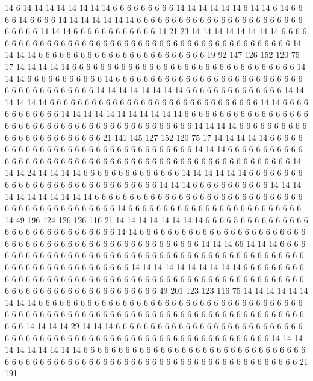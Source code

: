14 6 14 14 14 14 14 14 14 14 6 6 6 6 6 6 6 6 6 14
14 14 14 14 14 6 14 14 6 14 6 6 6 6 14 6 6 6 6 14
14 14 14 14 14 14 6 6 6 6 6 6 6 6 6 6 6 6 6 6
6 6 6 6 6 6 6 6 6 6 6 6 6 6 6 14 14 14 6 6
6 6 6 6 6 6 6 6 6 6 14 21 23 14 14 14 14 14 14 14
14 6 6 6 6 6 6 6 6 6 6 6 6 6 6 6 6 6 6 6
6 6 6 6 6 6 6 6 6 6 6 6 6 6 6 6 6 6 6 6
6 6 6 6 6 6 14 14 14 14 6 6 6 6 6 6 6 6 6 6
6 6 6 6 6 6 6 6 6 6 6 6 6 6 19 92 147 126 152 120
75 17 14 14 14 14 14 6 6 6 6 6 6 6 6 6 6 6 6 6
6 6 6 6 6 6 6 6 6 6 6 6 6 6 6 6 6 6 6 14
14 14 6 6 6 6 6 6 6 6 6 6 6 14 6 6 6 6 6 6
6 6 6 6 6 6 6 6 6 6 6 6 6 6 6 6 6 6 6 6
6 6 6 6 6 6 6 6 6 6 6 6 6 6 14 14 14 14 14 14
14 14 6 6 6 6 6 6 6 6 6 6 6 6 6 6 14 14 14 14
14 14 6 6 6 6 6 6 6 6 6 6 6 6 6 6 6 6 6 6
6 6 6 6 6 6 6 6 6 6 6 6 14 14 6 6 6 6 6 6
6 6 6 6 6 6 14 14 14 14 14 14 14 14 14 14 14 6 6 6
6 6 6 6 6 6 6 6 6 6 6 6 6 6 6 6 6 6 6 6
6 6 6 6 6 6 6 6 6 6 6 6 6 6 6 6 6 6 6 6
6 6 14 14 14 14 6 6 6 6 6 6 6 6 6 6 6 6 6 6
6 6 6 6 6 6 6 6 6 6 21 141 145 127 152 120 75 17 14 14
14 14 14 6 6 6 6 6 6 6 6 6 6 6 6 6 6 6 6 6
6 6 6 6 6 6 6 6 6 6 6 6 6 6 6 14 14 14 6 6
6 6 6 6 6 6 6 6 6 6 6 6 6 6 6 6 6 6 6 6
6 6 6 6 6 6 6 6 6 6 6 6 6 6 6 6 6 6 6 6
6 6 6 6 6 6 6 6 6 6 14 14 14 24 14 14 14 14 6 6
6 6 6 6 6 6 6 6 6 6 6 6 14 14 14 14 14 14 6 6
6 6 6 6 6 6 6 6 6 6 6 6 6 6 6 6 6 6 6 6
6 6 6 6 6 6 6 6 14 14 14 6 6 6 6 6 6 6 6 6
6 6 14 14 14 14 14 14 14 14 14 14 14 6 6 6 6 6 6 6
6 6 6 6 6 6 6 6 6 6 6 6 6 6 6 6 6 6 6 6
6 6 6 6 6 6 6 6 6 6 6 6 6 6 6 6 6 6 6 14
6 6 6 6 6 6 6 6 6 6 6 6 6 6 6 6 6 6 6 6
6 6 6 6 6 14 49 196 124 126 126 116 21 14 14 14 14 14 14 14
14 6 6 6 6 5 6 6 6 6 6 6 6 6 6 6 6 6 6 6
6 6 6 6 6 6 6 6 6 6 6 6 14 14 6 6 6 6 6 6
6 6 6 6 6 6 6 6 6 6 6 6 6 6 6 6 6 6 6 6
6 6 6 6 6 6 6 6 6 6 6 6 6 6 6 6 6 6 6 6
6 6 6 6 6 6 14 14 14 66 14 14 14 6 6 6 6 6 6 6
6 6 6 6 6 6 6 6 6 6 6 6 6 6 6 6 6 6 6 6
6 6 6 6 6 6 6 6 6 6 6 6 6 6 6 6 6 6 6 6
6 6 6 6 6 6 6 6 6 6 6 6 6 6 6 6 6 6 14 14
14 14 14 14 14 14 14 14 6 6 6 6 6 6 6 6 6 6 6 6
6 6 6 6 6 6 6 6 6 6 6 6 6 6 6 6 6 6 6 6
6 6 6 6 6 6 6 6 6 6 6 6 6 6 6 6 6 6 6 6
6 6 6 6 6 6 6 6 6 6 6 6 6 6 6 6 6 6 6 6
6 6 49 201 123 123 116 75 14 14 14 14 14 14 14 14 14 6 6 6
6 6 6 6 6 6 6 6 6 6 6 6 6 6 6 6 6 6 6 6
6 6 6 6 6 6 6 6 6 6 6 6 6 6 6 6 6 6 6 6
6 6 6 6 6 6 6 6 6 6 6 6 6 6 6 6 6 6 6 6
6 6 6 6 6 6 6 6 6 6 6 6 6 6 6 6 6 6 6 6
6 14 14 14 14 29 14 14 14 6 6 6 6 6 6 6 6 6 6 6
6 6 6 6 6 6 6 6 6 6 6 6 6 6 6 6 6 6 6 6
6 6 6 6 6 6 6 6 6 6 6 6 6 6 6 6 6 6 6 6
6 6 6 6 6 6 6 6 6 6 6 6 6 6 14 14 14 14 14 14
14 14 14 14 6 6 6 6 6 6 6 6 6 6 6 6 6 6 6 6
6 6 6 6 6 6 6 6 6 6 6 6 6 6 6 6 6 6 6 6
6 6 6 6 6 6 6 6 6 6 6 6 6 6 6 6 6 6 6 6
6 6 6 6 6 6 6 6 6 6 6 6 6 6 6 6 6 6 21 191

